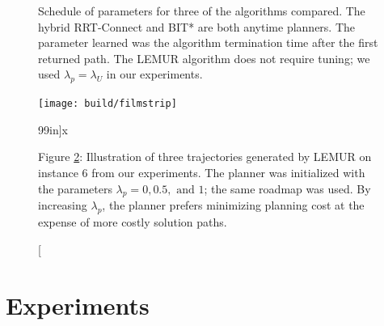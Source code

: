 \begin{figure}
   \centering
   \;\;%
   \;\;%
   \caption{Schedule of parameters for three of the algorithms
      compared.
      The hybrid RRT-Connect and BIT* are both anytime planners.
      The parameter learned was the algorithm termination time after
      the first returned path.
      The LEMUR algorithm does not require tuning;
      we used $\lambda_p = \lambda_U$ in our experiments.}
   \label{fig:herbarm-schedules}
\end{figure}

\begin{figure}
   \begin{widepage}
   \begin{center}
   
   \texttt{[image: build/filmstrip]}

   \caption[][99in]{x}
   \label{fig:filmstrip}

   \end{center}
   \end{widepage}

   \vspace{0.1in}
   \smallskip\noindent\small Figure \ref{fig:filmstrip}:
      Illustration of three trajectories generated by LEMUR
      on instance 6 from our experiments.
      The planner was initialized with the parameters
      $\lambda_p = 0, 0.5, \mbox{ and } 1$;
      the same roadmap was used.
      By increasing $\lambda_p$, the planner prefers minimizing
      planning cost at the expense of more costly solution paths.
\end{figure}


\section{Experiments}
\label{sec:experiments}

